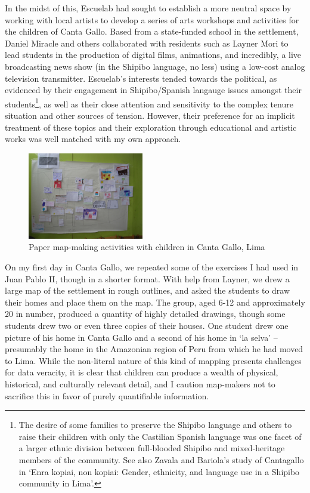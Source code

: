 \documentclass[11pt]{report}
\begin{document}
In the midst of this, Escuelab had sought to establish a more neutral space by working with local artists to develop a series of arts workshops and activities for the children of Canta Gallo. Based from a state-funded school in the settlement, Daniel Miracle and others collaborated with residents such as Layner Mori to lead students in the production of digital films, animations, and incredibly, a live broadcasting news show (in the Shipibo language, no less) using a low-cost analog television transmitter. Escuelab's interests tended towards the political, as evidenced by their engagement in Shipibo/Spanish langauge issues amongst their students\footnote{The desire of some families to preserve the Shipibo language and others to raise their children with only the Castilian Spanish language was one facet of a larger ethnic division between full-blooded Shipibo and mixed-heritage members of the community. See also Zavala and Bariola's study of Cantagallo in `Enra kopiai, non kopiai: Gender, ethnicity, and language use in a Shipibo community in Lima'.\cite{bariola2008gender}}, as well as their close attention and sensitivity to the complex tenure situation and other sources of tension. However, their preference for an implicit treatment of these topics and their exploration through educational and artistic works was well matched with my own approach.

\begin{figure}
	\begin{flushright}
		\includegraphics[width=0.45\textwidth]{images/canta-gallo-drawn-map.jpg}
		\caption{Paper map-making activities with children in Canta Gallo, Lima}
	\end{flushright}
\end{figure}

On my first day in Canta Gallo, we repeated some of the exercises I had used in Juan Pablo II, though in a shorter format. With help from Layner, we drew a large map of the settlement in rough outlines, and asked the students to draw their homes and place them on the map. The group, aged 6-12 and approximately 20 in number, produced a quantity of highly detailed drawings, though some students drew two or even three copies of their houses. One student drew one picture of his home in Canta Gallo and a second of his home in `la selva' -- presumably the home in the Amazonian region of Peru from which he had moved to Lima. While the non-literal nature of this kind of mapping presents challenges for data veracity, it is clear that children can produce a wealth of physical, historical, and culturally relevant detail, and I caution map-makers not to sacrifice this in favor of purely quantifiable information. 
\end{document}
